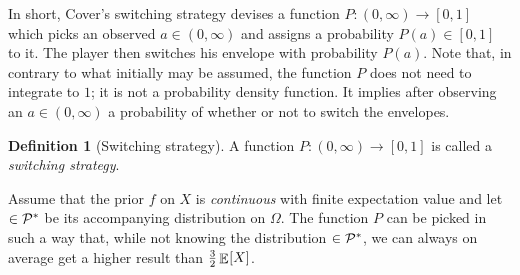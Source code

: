 \documentclass[a4paper]{report}
\theoremstyle{plain}
\theoremstyle{definition}
\newtheorem{definition}[theorem]{Definition}
\theoremstyle{remark}
\numberwithin{equation}{chapter}
\let\P\relax
\DeclareMathOperator{\P}{\mathbb{P}}
\DeclareMathOperator{\E}{\mathbb{E}}
\DeclareMathOperator{\1}{\mathbbm{1}}
\newcommand{\Pmod}{\mathcal{P}^*}
\begin{document}
In short, Cover's switching strategy devises a function $P\colon(0,\infty)\to[0,1]$ which picks an observed $a\in(0,\infty)$ and assigns a probability $P(a)\in[0,1]$ to it. The player then switches his envelope with probability $P(a)$. Note that, in contrary to what initially may be assumed, the function $P$ does not need to integrate to $1$; it is not a probability density function. It implies after observing an $a\in(0,\infty)$ a probability of whether or not to switch the envelopes.

\begin{definition}[Switching strategy]
A function $P\colon(0,\infty)\to[0,1]$ is called a \emph{switching strategy}.
\end{definition}

Assume that the prior $f$ on $X$ is \emph{continuous} with finite expectation value and let $\P\in\Pmod$ be its accompanying distribution on $\Omega$. The function $P$ can be picked in such a way that, while not knowing the distribution $\P\in\Pmod$, we can always on average get a higher result than $\frac{3}{2}\E_{\P}[X]$.
\end{document}
